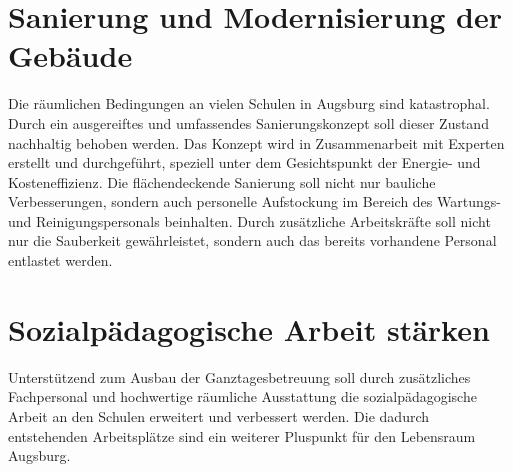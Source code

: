   \section{Sanierung und Modernisierung der Gebäude}
  
  Die räumlichen Bedingungen an vielen Schulen in Augsburg sind katastrophal. 
  Durch ein ausgereiftes und umfassendes Sanierungskonzept soll dieser Zustand 
  nachhaltig behoben werden. Das Konzept wird in Zusammenarbeit mit Experten 
  erstellt und durchgeführt, speziell unter dem Gesichtspunkt der Energie- und 
  Kosteneffizienz. Die flächendeckende Sanierung soll nicht nur bauliche 
  Verbesserungen, sondern auch personelle Aufstockung im Bereich des Wartungs- 
  und Reinigungspersonals beinhalten. Durch zusätzliche Arbeitskräfte soll 
  nicht nur die Sauberkeit gewährleistet, sondern auch das bereits vorhandene 
  Personal entlastet werden.
  
  \section{Sozialpädagogische Arbeit stärken}
  
  Unterstützend zum Ausbau der Ganztagesbetreuung soll durch zusätzliches 
  Fachpersonal und hochwertige räumliche Ausstattung die sozialpädagogische 
  Arbeit an den Schulen erweitert und verbessert werden. Die dadurch 
  entstehenden Arbeitsplätze sind ein weiterer Pluspunkt für den Lebensraum 
  Augsburg.
  